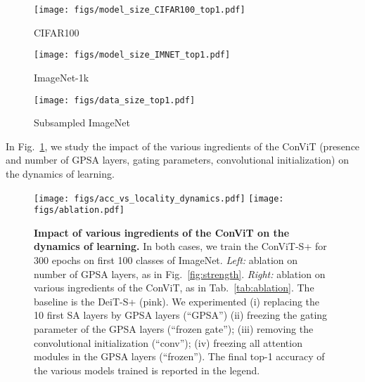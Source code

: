 \documentclass[a4paper,11pt,twocolumn]{article}
\begin{document}
\begin{figure*}[h]
    \centering
    \begin{subfigure}[b]{.31\textwidth}
    \texttt{[image: figs/model\_size\_CIFAR100\_top1.pdf]}
    \caption{CIFAR100}
    \end{subfigure}
    \begin{subfigure}[b]{.31\textwidth}
    \texttt{[image: figs/model\_size\_IMNET\_top1.pdf]}
    \caption{ImageNet-1k}
    \end{subfigure}
    \begin{subfigure}[b]{.35\textwidth}
    \texttt{[image: figs/data\_size\_top1.pdf]}
    \caption{Subsampled ImageNet}
    \end{subfigure}
    \caption{\textbf{The convolutional inductive bias is particularly useful for large models applied to small datasets.} Each of the three panels displays the top-1 accuracy of the ConViT+ model and their corresponding DeiT+ throughout training, as well as the relative improvement between the best top-1 accuracy reached by the DeiT+ and that reached by the ConViT+. \textit{Left:} tiny, small and base models trained for 3000 epochs on CIFAR100. \textit{Middle:} tiny, small and base models trained for 300 epochs on ImageNet-1k. The relative improvement of the ConViT over the DeiT increases with model size. \textit{Right:} small model trained on a subsampled version of ImageNet-1k, where we only keep a fraction  of the images of each class. The relative improvement of the ConViT over the DeiT increases with the size of the dataset.}
    \label{fig:time-dependence}
\end{figure*}

In Fig.~\ref{fig:ablation-dynamics}, we study the impact of the various ingredients of the ConViT (presence and number of GPSA layers, gating parameters, convolutional initialization) on the dynamics of learning. 

\begin{figure}[t]
    \centering
    \texttt{[image: figs/acc\_vs\_locality\_dynamics.pdf]}
    \texttt{[image: figs/ablation.pdf]}
    \caption{\textbf{Impact of various ingredients of the ConViT on the dynamics of learning.} In both cases, we train the ConViT-S+ for 300 epochs on first 100 classes of ImageNet. \textit{Left:} ablation on number of GPSA layers, as in Fig.~\ref{fig:strength}. \textit{Right:} ablation on various ingredients of the ConViT, as in Tab.~\ref{tab:ablation}. The baseline is the DeiT-S+ (pink). We experimented (i) replacing the 10 first SA layers by GPSA layers (``GPSA'') (ii) freezing the gating parameter of the GPSA layers (``frozen gate''); (iii) removing the convolutional initialization (``conv''); (iv) freezing all attention modules in the GPSA layers (``frozen''). The final top-1 accuracy of the various models trained is reported in the legend.}
    \label{fig:ablation-dynamics}
\end{figure}
\end{document}
